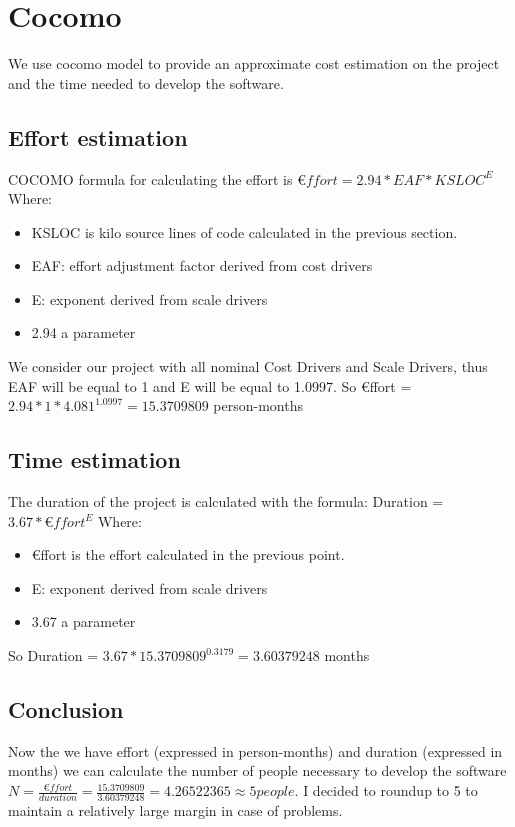 \section{Cocomo}
We use cocomo model to provide an approximate cost estimation on the project and the time needed to develop the software.

\subsection{Effort estimation}
COCOMO formula for calculating the effort is $€ffort= 2.94*EAF*KSLOC^{E}$
Where:
\begin{itemize}
	\item KSLOC is kilo source lines of code calculated in the previous section.
	\item EAF: effort adjustment factor derived from cost drivers
	\item E: exponent derived from scale drivers
	\item 2.94 a parameter
\end{itemize}
We consider our project with all nominal Cost Drivers and Scale Drivers, thus EAF will be equal to 1 and E will be equal to 1.0997.
So €ffort = $2.94*1*4.081^{1.0997} = 15.3709809$ person-months

\subsection{Time estimation}
The duration of the project is calculated with the formula: Duration = $3.67*€ffort^{E}$
Where:
\begin{itemize}
	\item €ffort is the effort calculated in the previous point.
	\item E: exponent derived from scale drivers
	\item 3.67 a parameter
\end{itemize}
So Duration = $3.67*15.3709809^{0.3179} = 3.60379248$ months

\subsection{Conclusion}
Now the we have effort (expressed in person-months) and duration (expressed in months) we can calculate the number of people necessary to develop the software
$N = \frac{€ffort}{duration} = \frac{15.3709809}{3.60379248} = 4.26522365 \approx 5 people$. I decided to roundup to 5 to maintain a relatively large margin in case of problems.